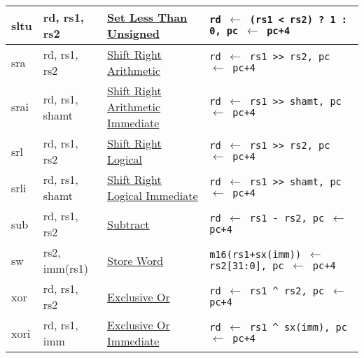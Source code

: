 \begin{tabular}{|ll|l|l|}
\hline
sltu  & rd, rs1, rs2   & \hyperref[insn:sltu]{Set Less Than Unsigned}   & {\tt rd $\leftarrow$ (rs1 < rs2) ? 1 : 0, pc $\leftarrow$ pc+4}\\
\hline
sra   & rd, rs1, rs2   & \hyperref[insn:sra]{Shift Right Arithmetic}    & {\tt rd $\leftarrow$ rs1 >> rs2, pc $\leftarrow$ pc+4}\\
\hline
srai  & rd, rs1, shamt & \hyperref[insn:srai]{Shift Right Arithmetic Immediate} & {\tt rd $\leftarrow$ rs1 >> shamt, pc $\leftarrow$ pc+4}\\
\hline
srl   & rd, rs1, rs2   & \hyperref[insn:srl]{Shift Right Logical}       & {\tt rd $\leftarrow$ rs1 >> rs2, pc $\leftarrow$ pc+4}\\
\hline
srli  & rd, rs1, shamt & \hyperref[insn:srli]{Shift Right Logical Immediate} & {\tt rd $\leftarrow$ rs1 >> shamt, pc $\leftarrow$ pc+4}\\
\hline
sub   & rd, rs1, rs2   & \hyperref[insn:sub]{Subtract}                  & {\tt rd $\leftarrow$ rs1 - rs2, pc $\leftarrow$ pc+4}\\
\hline
sw    & rs2, imm(rs1) & \hyperref[insn:sw]{Store Word}                  & {\tt m16(rs1+sx(imm)) $\leftarrow$ rs2[31:0], pc $\leftarrow$ pc+4}\\
\hline
xor   & rd, rs1, rs2   & \hyperref[insn:xor]{Exclusive Or}              & {\tt rd $\leftarrow$ rs1 \^{} rs2, pc $\leftarrow$ pc+4}\\
\hline
xori  & rd, rs1, imm  & \hyperref[insn:xori]{Exclusive Or Immediate}    & {\tt rd $\leftarrow$ rs1 \^{} sx(imm), pc $\leftarrow$ pc+4}\\
\hline
\end{tabular}

